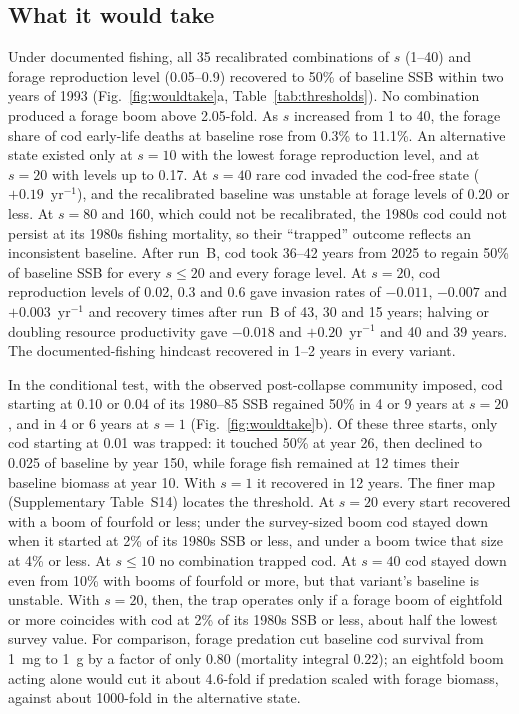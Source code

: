 \documentclass[12pt,letterpaper,fleqn]{article}
\newcommand{\yr}{yr$^{-1}$}
\begin{document}
\subsection{What it would take}\label{sec:res-wouldtake}

Under documented fishing, all 35 recalibrated combinations of $s$ (1--40) and forage reproduction level (0.05--0.9) recovered to 50\% of baseline SSB within two years of 1993 (Fig.~\ref{fig:wouldtake}a, Table~\ref{tab:thresholds}). No combination produced a forage boom above 2.05-fold. As $s$ increased from 1 to 40, the forage share of cod early-life deaths at baseline rose from 0.3\% to 11.1\%. An alternative state existed only at $s=10$ with the lowest forage reproduction level, and at $s=20$ with levels up to 0.17. At $s=40$ rare cod invaded the cod-free state ($+0.19$~\yr{}), and the recalibrated baseline was unstable at forage levels of 0.20 or less. At $s=80$ and 160, which could not be recalibrated, the 1980s cod could not persist at its 1980s fishing mortality, so their ``trapped'' outcome reflects an inconsistent baseline. After run~B, cod took 36--42 years from 2025 to regain 50\% of baseline SSB for every $s\leq20$ and every forage level. At $s=20$, cod reproduction levels of 0.02, 0.3 and 0.6 gave invasion rates of $-0.011$, $-0.007$ and $+0.003$~\yr{} and recovery times after run~B of 43, 30 and 15 years; halving or doubling resource productivity gave $-0.018$ and $+0.20$~\yr{} and 40 and 39 years. The documented-fishing hindcast recovered in 1--2 years in every variant.

In the conditional test, with the observed post-collapse community imposed, cod starting at 0.10 or 0.04 of its 1980--85 SSB regained 50\% in 4 or 9 years at $s=20$, and in 4 or 6 years at $s=1$ (Fig.~\ref{fig:wouldtake}b). Of these three starts, only cod starting at 0.01 was trapped: it touched 50\% at year 26, then declined to 0.025 of baseline by year 150, while forage fish remained at 12 times their baseline biomass at year 10. With $s=1$ it recovered in 12 years. The finer map (Supplementary Table~S14) locates the threshold. At $s=20$ every start recovered with a boom of fourfold or less; under the survey-sized boom cod stayed down when it started at 2\% of its 1980s SSB or less, and under a boom twice that size at 4\% or less. At $s\leq10$ no combination trapped cod. At $s=40$ cod stayed down even from 10\% with booms of fourfold or more, but that variant's baseline is unstable. With $s=20$, then, the trap operates only if a forage boom of eightfold or more coincides with cod at 2\% of its 1980s SSB or less, about half the lowest survey value. For comparison, forage predation cut baseline cod survival from 1~mg to 1~g by a factor of only 0.80 (mortality integral 0.22); an eightfold boom acting alone would cut it about 4.6-fold if predation scaled with forage biomass, against about 1000-fold in the alternative state.
\end{document}
